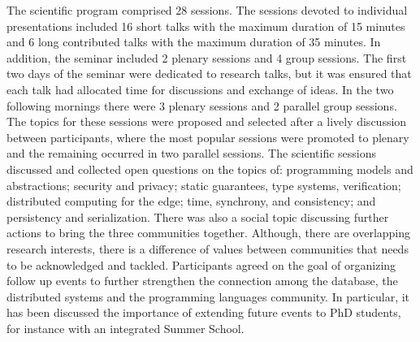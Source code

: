 \documentclass[a4paper,UKenglish]{dagrep-v2018}
\begin{document}
The scientific program comprised 28 sessions. The sessions devoted to individual presentations included 16 short talks with the maximum duration of 15 minutes and 6 long contributed talks with the maximum duration of 35 minutes.
In addition, the seminar included 2 plenary sessions and 4 group sessions. 
The first two days of the seminar were dedicated to research talks, but it was ensured that each talk had  
allocated time for discussions and exchange of ideas. In the two following mornings there were 3 plenary sessions and 2 parallel group sessions.
The topics for these sessions were proposed and selected after a lively discussion between participants, 
where the most popular sessions were promoted to plenary and the remaining occurred in two parallel sessions.
The scientific sessions discussed and collected open questions on the topics of: programming models and abstractions; security and privacy; 
static guarantees, type systems, verification; distributed computing for the edge; time, synchrony, and consistency; and persistency and serialization. There was also a social topic discussing further actions to bring the three communities together. Although, there are overlapping research interests, there is a difference of values between communities that needs to be acknowledged and tackled. 
Participants agreed on the goal of organizing follow up events to further strengthen the connection 
among the database, the distributed systems and the programming languages community. In particular, 
it has been discussed the importance of extending future events to PhD students, for instance with an integrated Summer School. 

\end{document}

